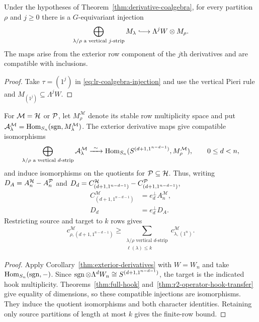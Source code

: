 \begin{corollary}
\label{thm:exterior-derivatives}
Under the hypotheses of Theorem~\ref{thm:derivative-coalgebra},
for every partition $\rho$ and $j\geq0$ there is a
$G$-equivariant injection
\begin{equation}\label{eq:exterior-injection}
 \bigoplus_{\lambda/\rho\text{ a vertical }j\text{-strip}}
       M_\lambda
 \lhook\joinrel\longrightarrow\Lambda^jW\otimes M_\rho.
\end{equation}
The maps arise from the exterior row component of the $j$th
derivatives and are compatible with inclusions.
\end{corollary}
\begin{proof}
Take $\tau=(1^j)$ in \eqref{eq:lr-coalgebra-injection} and use
the vertical Pieri rule and $M_{(1^j)}\subseteq\Lambda^jW$.
\end{proof}

\begin{corollary}
\label{cor:hook-lower}
\label{cor:hook-realization}
\label{cor:hook-defects}
For $\mathcal M=\mathcal H$ or $\mathcal P$, let $M_\rho^{\mathcal M}$ denote
its stable row multiplicity space and put
$\mathcal A_\lambda^{\mathcal M}
=\operatorname{Hom}_{S_n}(\operatorname{sgn},M_\lambda^{\mathcal M})$.
The exterior derivative maps give compatible isomorphisms
\begin{equation}\label{eq:hook-realization}
 \bigoplus_{\lambda/\rho\text{ a vertical }d\text{-strip}}
       \mathcal A_\lambda^{\mathcal M}
 \xrightarrow{\ \sim\ }
 \operatorname{Hom}_{S_n}(S^{(d+1,1^{n-d-1})},M_\rho^{\mathcal M}),
 \qquad 0\le d<n,
\end{equation}
and induce isomorphisms on the quotients for $\mathcal P\subseteq\mathcal H$.
Thus, writing $D_A=A_n^\mathcal H-A_n^\mathcal P$ and
$D_d=C_{(d+1,1^{n-d-1})}^\mathcal H-C_{(d+1,1^{n-d-1})}^\mathcal P$,
\begin{align}
 C_{(d+1,1^{n-d-1})}^{\mathcal M}
       &=e_d^\perp A_n^{\mathcal M},\label{eq:hook-lower}\\
 D_d&=e_d^\perp D_A.\label{eq:hook-defects}
\end{align}
Restricting source and target to $k$ rows gives
\[
 c_{\rho,(d+1,1^{n-d-1})}^{\mathcal M}
 \ge\sum_{\substack{\lambda/\rho\text{ vertical }d\text{-strip}\\
                    \ell(\lambda)\le k}}
            c_{\lambda,(1^n)}^{\mathcal M}.
\]
\end{corollary}
\begin{proof}
Apply Corollary~\ref{thm:exterior-derivatives} with $W=W_n$
and take $\operatorname{Hom}_{S_n}(\operatorname{sgn},-)$.
Since $\operatorname{sgn}\otimes\Lambda^dW_n\cong S^{(d+1,1^{n-d-1})}$,
the target is the indicated hook multiplicity.
Theorems~\ref{thm:full-hook} and~\ref{thm:r2-operator-hook-transfer}
give equality of dimensions, so these compatible injections are
isomorphisms. They induce the quotient isomorphisms and both
character identities. Retaining only source partitions of length
at most $k$ gives the finite-row bound.
\end{proof}

